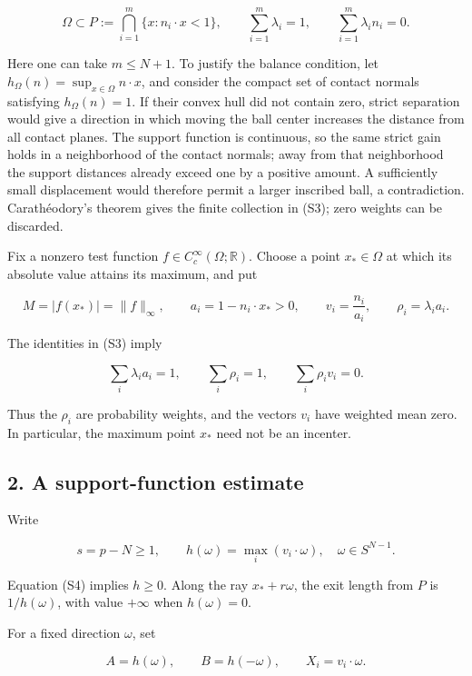\documentclass[11pt,a4paper]{article}
\begin{document}
\[
\Omega\subset P:=\bigcap_{i=1}^m\{x:n_i\cdot x<1\},
\qquad
\sum_{i=1}^m\lambda_i=1,
\qquad
\sum_{i=1}^m\lambda_i n_i=0.
\tag{S3}
\]

Here one can take \(m\leq N+1\). To justify the balance condition, let
\(h_\Omega(n)=\sup_{x\in\Omega}n\cdot x\), and consider the compact set
of contact normals satisfying \(h_\Omega(n)=1\). If their convex hull
did not contain zero, strict separation would give a direction in which
moving the ball center increases the distance from all contact planes.
The support function is continuous, so the same strict gain holds in a
neighborhood of the contact normals; away from that neighborhood the
support distances already exceed one by a positive amount. A
sufficiently small displacement would therefore permit a larger
inscribed ball, a contradiction. Carathéodory's theorem gives the finite
collection in (S3); zero weights can be discarded.

Fix a nonzero test function \(f\in C_c^\infty(\Omega;\mathbb R)\).
Choose a point \(x_*\in\Omega\) at which its absolute value attains its
maximum, and put

\[
M=|f(x_*)|=\|f\|_\infty,
\qquad
a_i=1-n_i\cdot x_*>0,
\qquad
v_i=\frac{n_i}{a_i},
\qquad
\rho_i=\lambda_i a_i.
\]

The identities in (S3) imply

\[
\sum_i\lambda_i a_i=1,
\qquad
\sum_i\rho_i=1,
\qquad
\sum_i\rho_i v_i=0.
\tag{S4}
\]

Thus the \(\rho_i\) are probability weights, and the vectors \(v_i\)
have weighted mean zero. In particular, the maximum point \(x_*\) need
not be an incenter.

\hypertarget{1016-a-support-function-estimate}{%
\subsection{2. A support-function
estimate}\label{1016-a-support-function-estimate}}

Write

\[
s=p-N\geq1,
\qquad
h(\omega)=\max_i(v_i\cdot\omega),
\quad\omega\in S^{N-1}.
\]

Equation (S4) implies \(h\geq0\). Along the ray \(x_*+r\omega\), the
exit length from \(P\) is \(1/h(\omega)\), with value \(+\infty\) when
\(h(\omega)=0\).

For a fixed direction \(\omega\), set

\[
A=h(\omega),\qquad B=h(-\omega),\qquad X_i=v_i\cdot\omega.
\]
\end{document}
